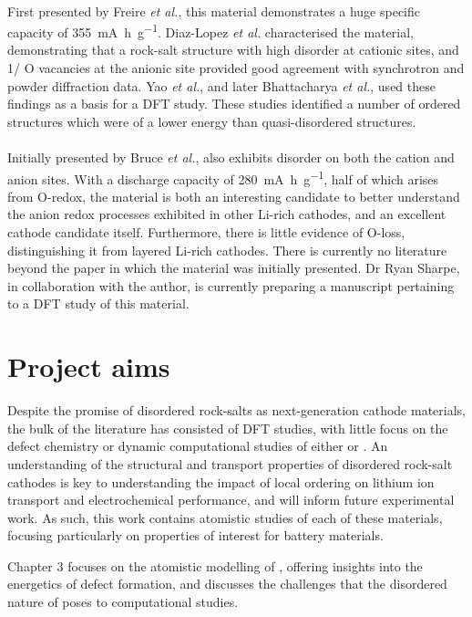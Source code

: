 \paragraph{}
First presented by Freire \textit{et al.},\cite{Freire2016} this material demonstrates a huge specific capacity of \SI{355}{\milli\ampere\hour\per\gram}.
Diaz-Lopez \textit{et al.}\cite{Diaz-Lopez2018} characterised the material, demonstrating that a  rock-salt structure with high  disorder at cationic sites, and 1/ O vacancies at the anionic site provided good agreement with synchrotron and powder diffraction data.
Yao \textit{et al.}\cite{Diaz-Lopez2017}, and later Bhattacharya \textit{et al.}, used these findings as a basis for a DFT study.
These studies identified a number of ordered structures which were of a lower energy than quasi-disordered structures.

\paragraph{}
Initially presented by Bruce \textit{et al.},\cite{House2018}  also exhibits disorder on both the cation and anion sites.
With a discharge capacity of \SI{280}{\milli\ampere\hour\per\gram}, half of which arises from O-redox, the material is both an interesting candidate to better understand the anion redox processes exhibited in other Li-rich cathodes, and an excellent cathode candidate itself.
Furthermore, there is little evidence of O-loss, distinguishing it from layered Li-rich cathodes.
There is currently no literature beyond the paper in which the material was initially presented. 
Dr Ryan Sharpe, in collaboration with the author, is currently preparing a manuscript pertaining to a DFT study of this material.

\section{Project aims}
Despite the promise of disordered rock-salts as next-generation cathode materials, the bulk of the literature has consisted of DFT studies, with little focus on the defect chemistry or dynamic computational studies of either  or .
An understanding of the structural and transport properties of disordered rock-salt cathodes is key to understanding the impact of local ordering on lithium ion transport and electrochemical performance, and will inform future experimental work.
As such, this work contains atomistic studies of each of these materials, focusing particularly on properties of interest for battery materials.

Chapter 3 focuses on the atomistic modelling of , offering insights into the energetics of defect formation, and discusses the challenges that the disordered nature of  poses to computational studies.
